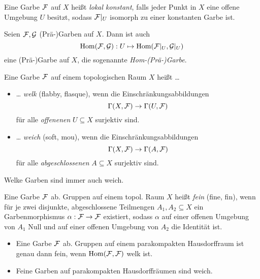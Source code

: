 \documentclass{cheat-sheet}
\begin{document}
\begin{defn}
  Eine Garbe $\mathcal{F}$ auf $X$ heißt \emph{lokal konstant}, falls jeder Punkt in $X$ eine offene Umgebung $U$ besitzt, sodass $\mathcal{F}|_U$ isomorph zu einer konstanten Garbe ist.
\end{defn}

\begin{defn}
  Seien $\mathcal{F}, \mathcal{G}$ (Prä-)Garben auf $X$. Dann ist auch
  \[ \operatorname{Hom}(\mathcal{F}, \mathcal{G}) : U \mapsto \operatorname{Hom}(\mathcal{F}|_U, \mathcal{G}|_U) \]
  eine (Prä-)Garbe auf $X$, die sogenannte \emph{Hom-(Prä-)Garbe}.
\end{defn}

\begin{defn}
   Eine Garbe $\mathcal{F}$ auf einem topologischen Raum $X$ heißt \ldots{}
  \begin{itemize}
    \item \ldots{} \emph{welk} (flabby, flasque), wenn die Einschränkungsabbildungen
    \[ \Gamma(X, \mathcal{F}) \to \Gamma(U, \mathcal{F}) \]
    für alle {\em offenenen} $U \subseteq X$ surjektiv sind.
    \item \ldots{} \emph{weich} (soft, mou), wenn die Einschränkungsabbildungen
    \[ \Gamma(X, \mathcal{F}) \to \Gamma(A, \mathcal{F}) \]
    für alle {\em abgeschlossenen} $A \subseteq X$ surjektiv sind.
  \end{itemize}
\end{defn}

\begin{lem}
  Welke Garben sind immer auch weich.
\end{lem}

\begin{defn}
   Eine Garbe $\mathcal{F}$ ab. Gruppen auf einem topol. Raum $X$ heißt \emph{fein} (fine, fin), wenn für je zwei disjunkte, abgeschlossene Teilmengen $A_1, A_2 \subseteq X$ ein Garbenmorphismus $\alpha : \mathcal{F} \to \mathcal{F}$ existiert, sodass $\alpha$ auf einer offenen Umgebung von $A_1$ Null und auf einer offenen Umgebung von $A_2$ die Identität ist.
\end{defn}

\begin{lem}
  \begin{itemize}
    \item Eine Garbe $\mathcal{F}$ ab. Gruppen auf einem parakompakten Hausdorffraum ist genau dann fein, wenn $\operatorname{Hom}(\mathcal{F}, \mathcal{F})$ welk ist.
    \item Feine Garben auf parakompakten Hausdorffräumen sind weich.
  \end{itemize}
\end{lem}
\end{document}
